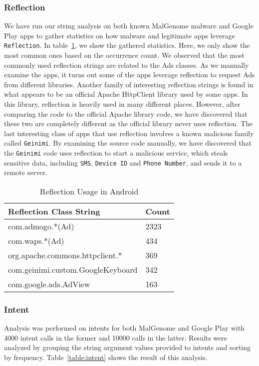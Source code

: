 \subsubsection{Reflection}
We have run our string analysis on both known MalGenome malware and Google Play
apps to gather statistics on how malware and legitimate apps leverage
\texttt{Reflection}. In table~\ref{table:reflection}, we show the gathered
statistics. Here, we only show the most common ones based on the occurrence
count. We observed that the most commonly used reflection strings are related to
the Ads classes. As we manually examine the apps, it turns out some of the apps
leverage reflection to request Ads from different libraries. Another family
of interesting reflection strings is found in what appears to be an official
Apache HttpClient library used by some apps. In this library,
reflection is heavily used in many different places. However, after comparing
the code to the official Apache library code, we have discovered that these two
are completely different as the official library never uses reflection. The last
interesting class of apps that use reflection involves a known malicious family
called \texttt{Geinimi}. By examining the source code manually, we have
discovered that the \texttt{Geinimi} code uses reflection to start a malicious
service, which steals sensitive data, including \texttt{SMS}, \texttt{Device ID}
and \texttt{Phone Number}, and sends it to a remote server.

\begin{table}[t]
  \begin{center}
    {\small
    \begin{tabular}{| l | l |}
      \hline
      \bf{Reflection Class String}&\bf{Count}\\ \hline
	com.admogo.*(Ad) &	2323\\
      \hline
	com.waps.*(Ad) & 434\\
      \hline
	org.apache.commons.httpclient.* & 369\\
      \hline
	com.geinimi.custom.GoogleKeyboard & 342\\
      \hline
	com.google.ads.AdView & 163\\
      \hline
    \end{tabular}
    }
\vspace{.1in}
    \caption{Reflection Usage in Android}
    \label{table:reflection}
  \end{center}
\end{table}

\subsubsection{Intent}
Analysis was performed on intents for both MalGenome and Google Play with 4000
intent calls in the former and 10000 calls in the latter.  Results were analyzed
by grouping the string argument values provided to intents and sorting by
frequency.  Table~\ref{table:intent} shows the result of this analysis.

